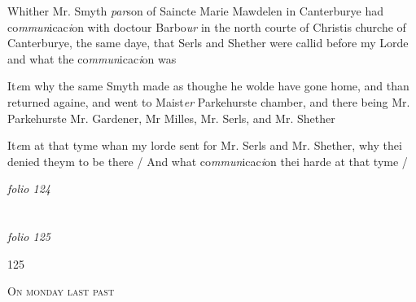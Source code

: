 \documentclass[12pt, a4paper]{book}
\begin{document}
		\ifthenelse{\isodd{\thepage}}
		{\reversemarginpar}
		{\normalmarginpar}
		Whither Mr. Smyth \textit{par}son of Saincte Marie Mawdelen in
            			Canterburye had co\textit{mmun}icac\textit{i}on with doctour Barbo\textit{ur} in the
            			north courte of Christis churche of Canterburye, the same
            			daye, that Serls and Shether were callid before my Lorde
 and what the co\textit{mmun}icac\textit{i}on was
            		
		\ifthenelse{\isodd{\thepage}}
		{\reversemarginpar}
		{\normalmarginpar}
		It\textit{e}m why the same Smyth made as thoughe he wolde have
            			gone home, and than returned againe, and went to Maist\textit{er}
            				Parkehurste chamber, and there being Mr. Parkehurste
 Mr. Gardener, Mr Milles, Mr. Serls, and Mr. Shether
            		
		\ifthenelse{\isodd{\thepage}}
		{\reversemarginpar}
		{\normalmarginpar}
		It\textit{e}m at that tyme whan my lorde sent for Mr. Serls and
 Mr. Shether, why thei denied theym to be there / And what
 co\textit{mmun}icac\textit{i}on thei harde at that tyme /

\dotfill
						\newpage
{}

\textit{folio 124}


         \vspace*{4cm}
         
\dotfill
						  \section*{}  \subsection*{}

\textit{folio 125}



\begin{flushright}{\color{Mahogany}125}\end{flushright}

				\begin{center} \begin{large} {\scshape On monday last past} \end{large} \end{center}
			
			
				
\end{document}
